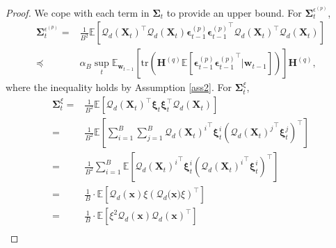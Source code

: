 \documentclass[11pt, letterpaper]{article}
\begin{document}
\begin{proof}
    We cope with each term in $\boldsymbol{\Sigma}_t$ to provide an upper bound. For $\boldsymbol{\Sigma}_t^{\epsilon^{(p)}}$,
    \begin{equation*}
        \begin{aligned}
            \boldsymbol{\Sigma}_t^{\epsilon^{(p)}}=&\frac{1}{B^2}\mathbb{E}\left[{\mathcal{Q}_d(\mathbf{X}_t)}^\top {\mathcal{Q}_d(\mathbf{X}_t)}\boldsymbol{\epsilon}_{t-1}^{(p)}{\boldsymbol{\epsilon}_{t-1}^{(p)}}^\top {\mathcal{Q}_d(\mathbf{X}_t)}^\top\mathcal{Q}_d(\mathbf{X}_t)\right]\\
            \preceq &\alpha_B \sup_t\mathbb{E}_{\mathbf{w}_{t-1}}\left[\mathrm{tr}\left(\mathbf{H}^{(q)} \mathbb{E}\left[\boldsymbol{\epsilon}_{t-1}^{(p)}{\boldsymbol{\epsilon}_{t-1}^{(p)}}^\top \big| \mathbf{w}_{t-1}\right]\right)\right]\mathbf{H}^{(q)},
        \end{aligned}
    \end{equation*}
    where the inequality holds by Assumption \ref{ass2}. For $\boldsymbol{\Sigma}_t^\xi$,
    \begin{equation}
    \label{Sigma epsilon t}
        \begin{aligned}
            \boldsymbol{\Sigma}_t^\xi=&\frac{1}{B^2}\mathbb{E}\left[{\mathcal{Q}_d(\mathbf{X}_t)}^\top \boldsymbol{\xi}_t\boldsymbol{\xi}_t^\top \mathcal{Q}_d(\mathbf{X}_t)\right]\\
            =&\frac{1}{B^2}\mathbb{E}\left[\sum_{i=1}^B\sum_{j=1}^B {{\mathcal{Q}_d(\mathbf{X}_t)}^i}^\top \boldsymbol{\xi}_t^i \left({{\mathcal{Q}_d(\mathbf{X}_t)}^j}^\top \boldsymbol{\xi}_t^j\right)^\top\right]\\
            =&\frac{1}{B^2}\sum_{i=1}^B\mathbb{E}\left[{{\mathcal{Q}_d(\mathbf{X}_t)}^i}^\top \boldsymbol{\xi}_t^i \left({{\mathcal{Q}_d(\mathbf{X}_t)}^i}^\top \boldsymbol{\xi}_t^i\right)^\top\right]\\
            =&\frac{1}{B}\cdot\mathbb{E}\left[{{\mathcal{Q}_d(\mathbf{x})}} \xi \left({{\mathcal{Q}_d(\mathbf{x}}}) \xi\right)^\top\right]\\
            =&\frac{1}{B}\cdot\mathbb{E}\left[\xi^2\mathcal{Q}_d(\mathbf{x})\mathcal{Q}_d(\mathbf{x})^\top\right]\\

\end{aligned}
\end{equation}
\end{proof}
\end{document}
